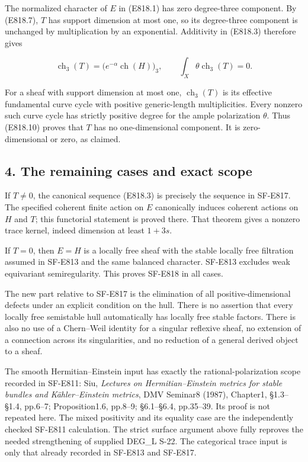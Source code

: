The normalized character of \(E\) in (E818.1) has zero degree-three
component. By (E818.7), \(T\) has support dimension at most one, so its
degree-three component is unchanged by multiplication by an exponential.
Additivity in (E818.3) therefore gives

\[
 \operatorname{ch}_3(T)
   =\bigl(e^{-\alpha}\operatorname{ch}(H)\bigr)_3,
 \qquad
 \int_X\theta\operatorname{ch}_3(T)=0.
 \tag{E818.10}
\]

For a sheaf with support dimension at most one,
\(\operatorname{ch}_3(T)\) is its effective fundamental curve cycle with
positive generic-length multiplicities. Every nonzero such curve cycle
has strictly positive degree for the ample polarization \(\theta\). Thus
(E818.10) proves that \(T\) has no one-dimensional component. It is
zero-dimensional or zero, as claimed.

\subsection{4. The remaining cases and exact
scope}\label{SF-E818-the-remaining-cases-and-exact-scope}

If \(T\ne0\), the canonical sequence (E818.3) is precisely the sequence
in SF-E817. The specified coherent finite action on \(E\) canonically
induces coherent actions on \(H\) and \(T\); this functorial statement
is proved there. That theorem gives a nonzero trace kernel, indeed
dimension at least \(1+3s\).

If \(T=0\), then \(E=H\) is a locally free sheaf with the stable locally
free filtration assumed in SF-E813 and the same balanced character.
SF-E813 excludes weak equivariant semiregularity. This proves SF-E818 in
all cases.

The new part relative to SF-E817 is the elimination of all
positive-dimensional defects under an explicit condition on the hull.
There is no assertion that every locally free semistable hull
automatically has locally free stable factors. There is also no use of a
Chern--Weil identity for a singular reflexive sheaf, no extension of a
connection across its singularities, and no reduction of a general
derived object to a sheaf.

The smooth Hermitian--Einstein input has exactly the
rational-polarization scope recorded in SF-E811: Siu, \emph{Lectures on
Hermitian--Einstein metrics for stable bundles and Kähler--Einstein
metrics}, DMV Seminar8 (1987), Chapter1, §1.3--§1.4, pp.6--7;
Proposition1.6, pp.8--9; §6.1--§6.4, pp.35--39. Its proof is not
repeated here. The mixed positivity and its equality case are the
independently checked SF-E811 calculation. The strict surface argument
above fully reproves the needed strengthening of supplied DEG\_L S-22.
The categorical trace input is only that already recorded in SF-E813 and
SF-E817.
